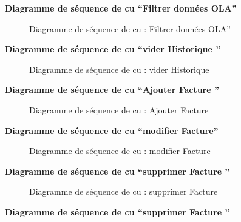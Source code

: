 \documentclass[a4paper,11pt]{report}
\begin{document}
\newpage
\textbf{ Diagramme de séquence de cu “Filtrer données OLA”}

\begin{figure}[H]
  \centering
  \setlength{\fboxrule}{1pt}
  \setlength{\fboxsep}{3pt}
  \caption{ Diagramme de séquence de cu : Filtrer données OLA”
 }
  \label{fig:clone-result}
\end{figure}

\newpage
\textbf{ Diagramme de séquence de cu “vider Historique ”}

\begin{figure}[H]
  \centering
  \setlength{\fboxrule}{1pt}
  \setlength{\fboxsep}{3pt}
  \caption{ Diagramme de séquence de cu : vider Historique 
 }
  \label{fig:clone-result}
\end{figure}

\newpage
\textbf{ Diagramme de séquence de cu “Ajouter Facture  ”}

\begin{figure}[H]
  \centering
  \setlength{\fboxrule}{1pt}
  \setlength{\fboxsep}{3pt}
  \caption{ Diagramme de séquence de cu : Ajouter Facture 
 }
  \label{fig:clone-result}
\end{figure}
\newpage
\textbf{ Diagramme de séquence de cu “modifier Facture”}

\begin{figure}[H]
  \centering
  \setlength{\fboxrule}{1pt}
  \setlength{\fboxsep}{3pt}
  \caption{ Diagramme de séquence de cu : modifier Facture
 }
  \label{fig:clone-result}
\end{figure}

\newpage
\textbf{ Diagramme de séquence de cu “supprimer Facture ”}

\begin{figure}[H]
  \centering
  \setlength{\fboxrule}{1pt}
  \setlength{\fboxsep}{3pt}
  \caption{ Diagramme de séquence de cu : supprimer Facture 
 }
  \label{fig:clone-result}
\end{figure}

\newpage
\textbf{ Diagramme de séquence de cu “supprimer Facture ”}
\end{document}
